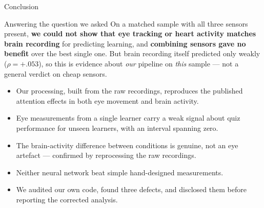 \documentclass[aspectratio=169,10pt]{beamer}
\begin{document}
\begin{frame}{Conclusion}
  \begin{block}{Answering the question we asked}
    On a matched sample with all three sensors present, \textbf{we could not
    show that eye tracking or heart activity matches brain recording} for
    predicting learning, and \textbf{combining sensors gave no benefit} over
    the best single one. But brain recording itself predicted only weakly
    ($\rho = +.053$), so this is evidence about \emph{our} pipeline on
    \emph{this} sample --- not a general verdict on cheap sensors.
  \end{block}

  \vspace{0.3em}
  \begin{itemize}\small
    \item Our processing, built from the raw recordings, reproduces the
      published attention effects in both eye movement and brain activity.
    \item Eye measurements from a single learner carry a weak signal about
      quiz performance for unseen learners, with an interval spanning zero.
    \item The brain-activity difference between conditions is genuine, not an
      eye artefact --- confirmed by reprocessing the raw recordings.
    \item Neither neural network beat simple hand-designed measurements.
    \item We audited our own code, found three defects, and disclosed them
      before reporting the corrected analysis.
  \end{itemize}
\end{frame}
\end{document}
